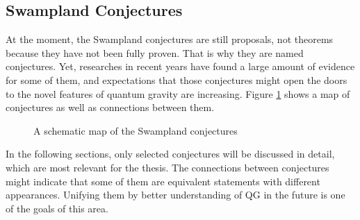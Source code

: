 \subsection{Swampland Conjectures}
At the moment, the Swampland conjectures are still proposals, not theorems because they have not been fully proven. That is why they are named conjectures. Yet, researches in recent years have found a large amount of evidence for some of them, and expectations that those conjectures might open the doors to the novel features of quantum gravity are increasing. Figure \ref{fig:connection} shows a map of conjectures as well as connections between them.
\begin{figure}[h]
    \centering
    \caption{A schematic map of the Swampland conjectures}
    \label{fig:connection}
\end{figure}
In the following sections, only selected conjectures will be discussed in detail, which are most relevant for the thesis. The connections between conjectures might indicate that some of them are equivalent statements with different appearances. Unifying them by better understanding of QG in the future is one of the goals of this area.

